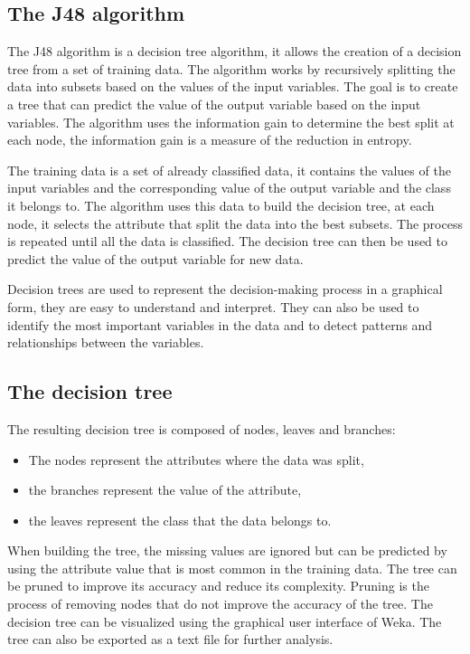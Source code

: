 \subsection{The J48 algorithm}
\label{subsec:j48}

The J48 algorithm is a decision tree algorithm, it allows the creation of a decision tree from a set of training data. The
algorithm works by recursively splitting the data into subsets based on the values of the input variables. The goal is to
create a tree that can predict the value of the output variable based on the input variables. The algorithm uses the
information gain to determine the best split at each node, the information gain is a measure of the reduction in entropy.

The training data is a set of already classified data, it contains the values of the input variables and the corresponding
value of the output variable and the class it belongs to. The algorithm uses this data to build the decision tree, at each
node, it selects the attribute that split the data into the best subsets. The process is repeated until all the data is
classified. The decision tree can then be used to predict the value of the output variable for new data.

Decision trees are used to represent the decision-making process in a graphical form, they are easy to understand and
interpret. They can also be used to identify the most important variables in the data and to detect patterns and
relationships between the variables.

\subsection{The decision tree}
\label{subsubsec:decision-tree}

The resulting decision tree is composed of nodes, leaves and branches:
\begin{itemize}
  \item The nodes represent the attributes where the data was split,
  \item the branches represent the value of the attribute,
  \item the leaves represent the class that the data belongs to.
\end{itemize}

When building the tree, the missing values are ignored but can be predicted by using the attribute value that is most
common in the training data. The tree can be pruned to improve its accuracy and reduce its complexity. Pruning is the
process of removing nodes that do not improve the accuracy of the tree. The decision tree can be visualized using the
graphical user interface of Weka. The tree can also be exported as a text file for further analysis.

